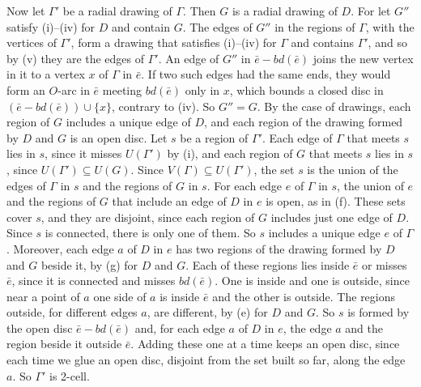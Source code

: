 {Now let $\Gamma'$ be a radial drawing of $\Gamma$. Then $G$ is a radial drawing of $D$. For let $G''$ satisfy (i)--(iv) for $D$ and contain $G$. The edges of $G''$ in the regions of $\Gamma$, with the vertices of $\Gamma'$, form a drawing that satisfies (i)--(iv) for $\Gamma$ and contains $\Gamma'$, and so by (v) they are the edges of $\Gamma'$. An edge of $G''$ in $\bar{e} - bd(\bar{e})$ joins the new vertex in it to a vertex $x$ of $\Gamma$ in $\bar{e}$. If two such edges had the same ends, they would form an $O$-arc in $\bar{e}$ meeting $bd(\bar{e})$ only in $x$, which bounds a closed disc in $(\bar{e} - bd(\bar{e})) \cup \{x\}$, contrary to (iv). So $G'' = G$. By the case of drawings, each region of $G$ includes a unique edge of $D$, and each region of the drawing formed by $D$ and $G$ is an open disc. Let $s$ be a region of $\Gamma'$. Each edge of $\Gamma$ that meets $s$ lies in $s$, since it misses $U(\Gamma')$ by (i), and each region of $G$ that meets $s$ lies in $s$, since $U(\Gamma') \subseteq U(G)$. Since $V(\Gamma) \subseteq U(\Gamma')$, the set $s$ is the union of the edges of $\Gamma$ in $s$ and the regions of $G$ in $s$. For each edge $e$ of $\Gamma$ in $s$, the union of $e$ and the regions of $G$ that include an edge of $D$ in $e$ is open, as in (f). These sets cover $s$, and they are disjoint, since each region of $G$ includes just one edge of $D$. Since $s$ is connected, there is only one of them. So $s$ includes a unique edge $e$ of $\Gamma$. Moreover, each edge $a$ of $D$ in $e$ has two regions of the drawing formed by $D$ and $G$ beside it, by (g) for $D$ and $G$. Each of these regions lies inside $\bar{e}$ or misses $\bar{e}$, since it is connected and misses $bd(\bar{e})$. One is inside and one is outside, since near a point of $a$ one side of $a$ is inside $\bar{e}$ and the other is outside. The regions outside, for different edges $a$, are different, by (e) for $D$ and $G$. So $s$ is formed by the open disc $\bar{e} - bd(\bar{e})$ and, for each edge $a$ of $D$ in $e$, the edge $a$ and the region beside it outside $\bar{e}$. Adding these one at a time keeps an open disc, since each time we glue an open disc, disjoint from the set built so far, along the edge $a$. So $\Gamma'$ is 2-cell.}

